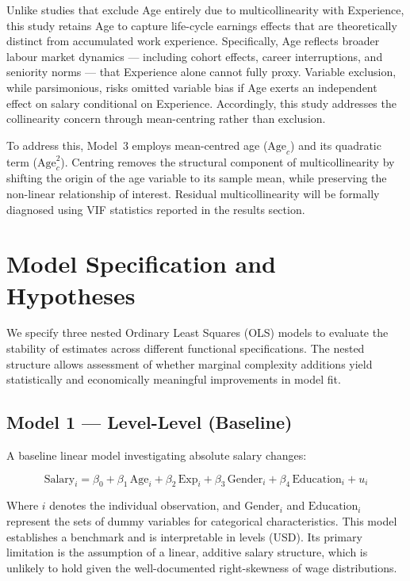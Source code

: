 \documentclass[12pt, a4paper]{article}
\begin{document}
Unlike studies that exclude Age entirely due to multicollinearity with Experience, this study retains Age to capture life-cycle earnings effects that are theoretically distinct from accumulated work experience. Specifically, Age reflects broader labour market dynamics — including cohort effects, career interruptions, and seniority norms — that Experience alone cannot fully proxy. Variable exclusion, while parsimonious, risks omitted variable bias if Age exerts an independent effect on salary conditional on Experience. Accordingly, this study addresses the collinearity concern through mean-centring rather than exclusion.

To address this, Model~3 employs mean-centred age ($\text{Age}_c$) and its quadratic
term ($\text{Age}_c^2$). Centring removes the structural component of multicollinearity
by shifting the origin of the age variable to its sample mean, while preserving the
non-linear relationship of interest. Residual multicollinearity will be formally
diagnosed using VIF statistics reported in the results section.

\section{Model Specification and Hypotheses}

We specify three nested Ordinary Least Squares (OLS) models to evaluate the stability of
estimates across different functional specifications. The nested structure allows
assessment of whether marginal complexity additions yield statistically and economically
meaningful improvements in model fit.

\subsection{Model 1 — Level-Level (Baseline)}

A baseline linear model investigating absolute salary changes:

\begin{equation}
  \text{Salary}_i = \beta_0 + \beta_1\,\text{Age}_i + \beta_2\,\text{Exp}_i + \beta_3\,\text{Gender}_i + \beta_4\,\text{Education}_i + u_i
  \label{eq:m1}
\end{equation}

Where $i$ denotes the individual observation, and $\text{Gender}_i$ and $\text{Education}_i$ represent the sets of dummy variables for categorical characteristics. This model establishes a benchmark and is interpretable in levels (USD). Its primary
limitation is the assumption of a linear, additive salary structure, which is unlikely to
hold given the well-documented right-skewness of wage distributions.
\end{document}
